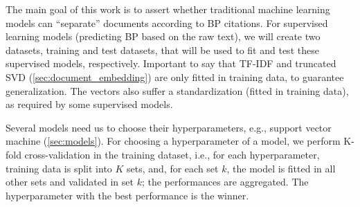     The main goal of this work is to assert whether traditional machine learning models can ``separate'' documents according to BP citations. For supervised learning models (predicting BP based on the raw text), we will create two datasets, training and test datasets, that will be used to fit and test these supervised models, respectively. Important to say that TF-IDF and truncated SVD (\autoref{sec:document_embedding}) are only fitted in training data, to guarantee generalization. The vectors also suffer a standardization (fitted in training data), as required by some supervised models.

    Several models need us to choose their hyperparameters, e.g., support vector machine (\autoref{sec:models}). For choosing a hyperparameter of a model, we perform K-fold cross-validation in the training dataset, i.e., for each hyperparameter, training data is split into $K$ sets, and, for each set $k$, the model is fitted in all other sets and validated in set $k$; the performances are aggregated. The hyperparameter with the best performance is the winner.
